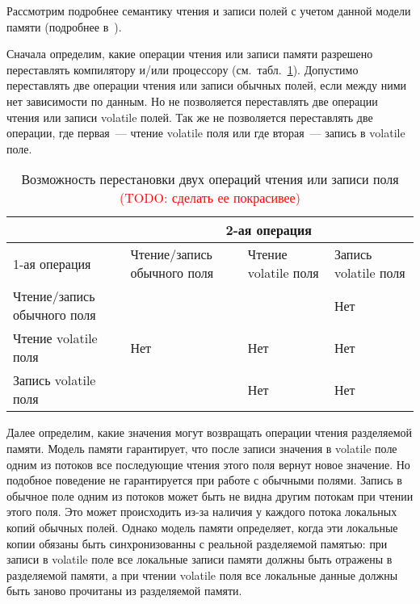 \documentclass[14pt,titlepage]{extarticle}
\newcommand{\todo}[1]{\textcolor{red}{(\eng{TODO}: #1)}}
\newcommand{\eng}[1]{{\English#1}}
\begin{document}
      Рассмотрим подробнее семантику чтения и записи полей с учетом данной
      модели памяти (подробнее в~\cite{jsr133_cookbook}).

      Сначала определим, какие операции чтения или записи памяти разрешено
      переставлять компилятору и/или процессору
      (см.~табл.~\ref{tabular:can_reorder}).
      Допустимо переставлять две операции чтения или записи обычных полей, если
      между ними нет зависимости по данным. Но не позволяется переставлять две
      операции чтения или записи \eng{volatile} полей. Так же не позволяется
      переставлять две операции, где первая~--- чтение \eng{volatile} поля или
      где вторая~--- запись в \eng{volatile} поле.

      \begin{table}[!htb]
        \centering
        \begin{tabular}{ |p{}|p{}|p{}|p{}| }
          \hline
          & \multicolumn{3}{c|}{2-ая операция} \\ \hline
          1-ая операция & Чтение/запись обычного поля
                        & Чтение \eng{volatile} поля
                        & Запись \eng{volatile} поля \\ \hline
          Чтение/запись обычного поля &     &     & Нет \\ \hline
          Чтение \eng{volatile} поля  & Нет & Нет & Нет \\ \hline
          Запись \eng{volatile} поля  &     & Нет & Нет \\ \hline
        \end{tabular}
        \caption{Возможность перестановки двух операций чтения или записи поля
                 \todo{сделать ее покрасивее}}
        \label{tabular:can_reorder}
      \end{table}

      Далее определим, какие значения могут возвращать операции чтения
      разделяемой памяти. Модель памяти гарантирует, что после записи значения
      в \eng{volatile} поле одним из потоков все последующие чтения этого поля
      вернут новое значение. Но подобное поведение не гарантируется при работе
      с обычными полями. Запись в обычное поле одним из потоков может быть не
      видна другим потокам при чтении этого поля. Это может происходить из-за
      наличия у каждого потока локальных копий обычных полей.  Однако модель
      памяти определяет, когда эти локальные копии обязаны быть синхронизованны
      с реальной разделяемой памятью: при записи в \eng{volatile} поле все
      локальные записи памяти должны быть отражены в разделяемой памяти, а при
      чтении \eng{volatile} поля все локальные данные должны быть заново
      прочитаны из разделяемой памяти.
\end{document}

